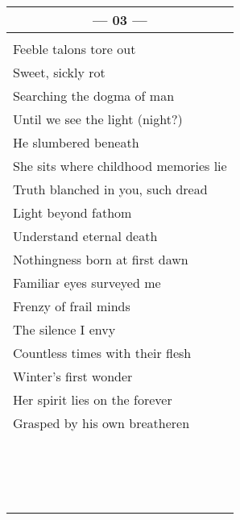 \documentclass{article}
\begin{document}
\begin{center}
\begin{tabular}{l}
\multicolumn{1}{c}{\textbf{--- 03 ---}} \\ \hline
\\
Feeble talons tore out \\
Sweet, sickly rot \\
Searching the dogma of man \\
Until we see the light (night?) \\
He slumbered beneath \\
She sits where childhood memories lie \\
Truth blanched in you, such dread \\
Light beyond fathom \\
Understand eternal death \\
Nothingness born at first dawn \\
Familiar eyes surveyed me \\
Frenzy of frail minds \\
The silence I envy \\
Countless times with their flesh \\
Winter's first wonder \\
Her spirit lies on the forever \\
Grasped by his own breatheren \\
\\
\\
\\
\\
\\
\\
\\
\\
\\
\\
\\
\\
\\
\\
\\
\\
\end{tabular}
\end{center}
\end{document}

